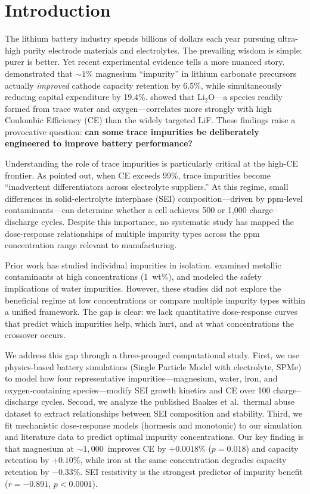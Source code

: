 \section{Introduction}
\label{sec:introduction}

The lithium battery industry spends billions of dollars each year pursuing ultra-high purity electrode materials and electrolytes. The prevailing wisdom is simple: purer is better. Yet recent experimental evidence tells a more nuanced story. \citet{choe2024reevaluation} demonstrated that ${\sim}1\%$ magnesium ``impurity'' in lithium carbonate precursors actually \emph{improved} cathode capacity retention by 6.5\%, while simultaneously reducing capital expenditure by 19.4\%. \citet{hobold2024lithiumoxide} showed that Li$_2$O---a species readily formed from trace water and oxygen---correlates more strongly with high Coulombic Efficiency (CE) than the widely targeted LiF. These findings raise a provocative question: {\bf can some trace impurities be deliberately engineered to improve battery performance?}

Understanding the role of trace impurities is particularly critical at the high-CE frontier. As \citet{hobold2021beyond} pointed out, when CE exceeds 99\%, trace impurities become ``inadvertent differentiators across electrolyte suppliers.'' At this regime, small differences in solid-electrolyte interphase (SEI) composition---driven by ppm-level contaminants---can determine whether a cell achieves 500 or 1{,}000 charge--discharge cycles. Despite this importance, no systematic study has mapped the dose-response relationships of multiple impurity types across the ppm concentration range relevant to manufacturing.

Prior work has studied individual impurities in isolation. \citet{fink2021metallic} examined metallic contaminants at high concentrations (1~wt\%), and \citet{baakes2023impact} modeled the safety implications of water impurities. However, these studies did not explore the beneficial regime at low concentrations or compare multiple impurity types within a unified framework. The gap is clear: we lack quantitative dose-response curves that predict which impurities help, which hurt, and at what concentrations the crossover occurs.

We address this gap through a three-pronged computational study. First, we use physics-based battery simulations (\pybamm Single Particle Model with electrolyte, SPMe) to model how four representative impurities---magnesium, water, iron, and oxygen-containing species---modify SEI growth kinetics and CE over 100 charge--discharge cycles. Second, we analyze the published Baakes et al.\ thermal abuse dataset to extract relationships between SEI composition and stability. Third, we fit mechanistic dose-response models (hormesis and monotonic) to our simulation and literature data to predict optimal impurity concentrations. Our key finding is that magnesium at ${\sim}1{,}000$~\ppm improves CE by $+0.0018\%$ ($p=0.018$) and capacity retention by $+0.10\%$, while iron at the same concentration degrades capacity retention by $-0.33\%$. SEI resistivity is the strongest predictor of impurity benefit ($r=-0.891$, $p<0.0001$).

